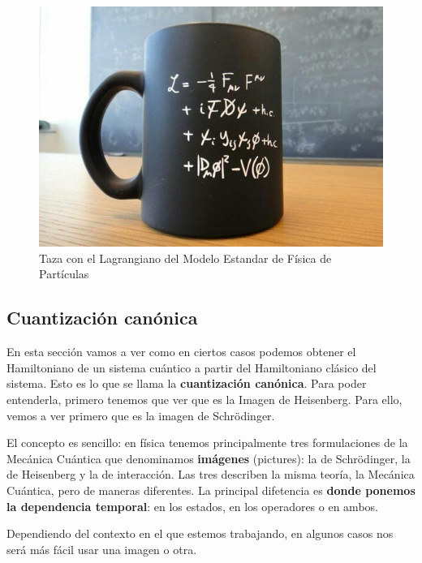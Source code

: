     \begin{figure}[h]
        \centering 
        \includegraphics[width=0.6\linewidth]{Figuras/Fig_sqc_taza_Modelo_Estandar.png}
        \caption{Taza con el Lagrangiano del Modelo Estandar de Física de Partículas}
        \label{Fig_sqc_taza_Modelo_Estandar}
    \end{figure}


    \subsection{Cuantización canónica}  \label{sec_scq_cuantizacion_canonica}

    En esta sección vamos a ver como en ciertos casos podemos obtener el Hamiltoniano de un sistema cuántico a partir del Hamiltoniano clásico del sistema. Esto es lo que se llama la \textbf{cuantización canónica}. Para poder entenderla, primero tenemos que ver que es la Imagen de Heisenberg. Para ello, vemos a ver primero que es la imagen de Schrödinger.

    El concepto es sencillo: en física tenemos principalmente tres formulaciones de la Mecánica Cuántica que denominamos \textbf{imágenes} (pictures): la de Schrödinger, la de Heisenberg y la de interacción. Las tres describen la misma teoría, la Mecánica Cuántica, pero de maneras diferentes. La principal difetencia es \textbf{donde ponemos la dependencia temporal}: en los estados, en los operadores o en ambos. 

    Dependiendo del contexto en el que estemos trabajando, en algunos casos nos será más fácil usar una imagen o otra.


